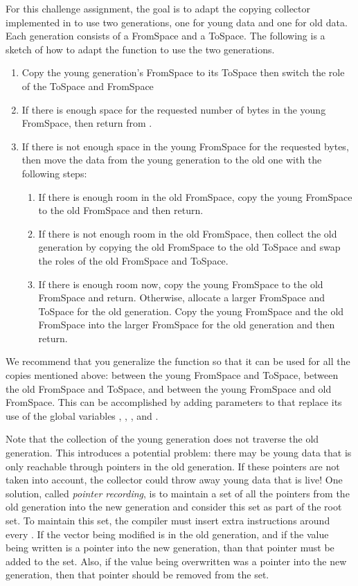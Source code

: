 \documentclass[11pt]{book}
\begin{document}
For this challenge assignment, the goal is to adapt the copying
collector implemented in  to use two generations, one
for young data and one for old data. Each generation consists of a
FromSpace and a ToSpace. The following is a sketch of how to adapt the
 function to use the two generations.

\begin{enumerate}
\item Copy the young generation's FromSpace to its ToSpace then switch
  the role of the ToSpace and FromSpace
\item If there is enough space for the requested number of bytes in
  the young FromSpace, then return from .
\item If there is not enough space in the young FromSpace for the
  requested bytes, then move the data from the young generation to the
  old one with the following steps:
  \begin{enumerate}
  \item If there is enough room in the old FromSpace, copy the young
    FromSpace to the old FromSpace and then return.
  \item If there is not enough room in the old FromSpace, then collect
    the old generation by copying the old FromSpace to the old ToSpace
    and swap the roles of the old FromSpace and ToSpace.
  \item If there is enough room now, copy the young FromSpace to the
    old FromSpace and return. Otherwise, allocate a larger FromSpace
    and ToSpace for the old generation.  Copy the young FromSpace and
    the old FromSpace into the larger FromSpace for the old
    generation and then return.
  \end{enumerate}
\end{enumerate}

We recommend that you generalize the  function so that it
can be used for all the copies mentioned above: between the young
FromSpace and ToSpace, between the old FromSpace and ToSpace, and
between the young FromSpace and old FromSpace. This can be
accomplished by adding parameters to  that replace its
use of the global variables ,
, , and .

Note that the collection of the young generation does not traverse the
old generation. This introduces a potential problem: there may be
young data that is only reachable through pointers in the old
generation. If these pointers are not taken into account, the
collector could throw away young data that is live!  One solution,
called \emph{pointer recording}, is to maintain a set of all the
pointers from the old generation into the new generation and consider
this set as part of the root set.  To maintain this set, the compiler
must insert extra instructions around every . If the
vector being modified is in the old generation, and if the value being
written is a pointer into the new generation, than that pointer must
be added to the set. Also, if the value being overwritten was a
pointer into the new generation, then that pointer should be removed
from the set.
\end{document}
